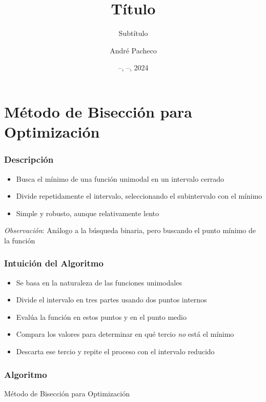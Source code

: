 \documentclass{beamer}
\title{Título}
\subtitle{Subtítulo}
\author{André Pacheco}
\date{ --, --, 2024}
\begin{document}
\maketitle

\section{Método de Bisección para Optimización}

\begin{frame}
\frametitle{Descripción}
\begin{itemize}
    \item Busca el mínimo de una función unimodal en un intervalo cerrado
    \item Divide repetidamente el intervalo, seleccionando el subintervalo con el mínimo
    \item Simple y robusto, aunque relativamente lento
\end{itemize}
\textit{Observación}: Análogo a la búsqueda binaria, pero buscando el punto mínimo de la función
\end{frame}

\begin{frame}
\frametitle{Intuición del Algoritmo}
\begin{itemize}
    \item Se basa en la naturaleza de las funciones unimodales
    \item Divide el intervalo en tres partes usando dos puntos internos
    \item Evalúa la función en estos puntos y en el punto medio
    \item Compara los valores para determinar en qué tercio \textit{no} está el mínimo
    \item Descarta ese tercio y repite el proceso con el intervalo reducido
\end{itemize}
\end{frame}


\begin{frame}
\frametitle{Algoritmo}
\begin{algorithm}[H]
\SetAlgoLined
{}
\;
\caption{Método de Bisección para Optimización}
\end{algorithm}
\end{frame}
\end{document}
